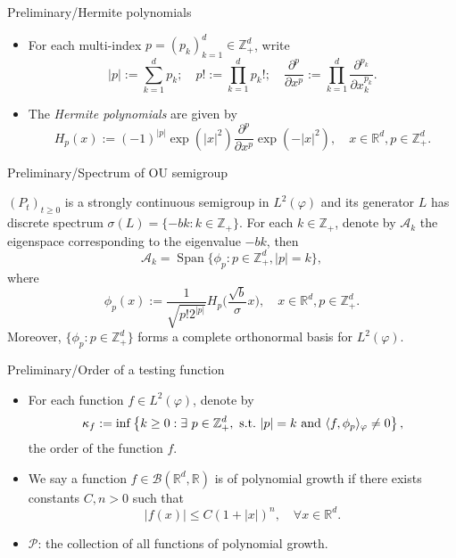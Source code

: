 \documentclass[xcolor=dvipsnames]{beamer}
\begin{document}
\begin{frame}{Preliminary/Hermite polynomials}
\begin{itemize}
\item
    For each multi-index $p = (p_k)_{k = 1}^d \in \mathbb{Z}_+^{d}$, write 
\begin{equation}
	|p|:=\sum_{k=1}^d p_k;
	\quad p!:= \prod_{k= 1}^d p_k!;
	\quad \frac{\partial^p} {\partial x^p}:= \prod_{k = 1}^d\frac{\partial^{p_k}}{\partial x_k^{p_k}}.
\end{equation}
\item
    The \emph{Hermite polynomials} are given by
\begin{equation}
    H_p(x)
    :=(-1)^{|p|}\exp(|x|^2) \frac{\partial ^{p}}{\partial x^p} \exp(-|x|^2) ,
    \quad x\in \mathbb R^d,
    p \in \mathbb{Z}_+^{d}.
\end{equation}
\end{itemize}
\end{frame}

\begin{frame}{Preliminary/Spectrum of OU semigroup}

\begin{lemma}
	$(P_t)_{t\geq 0}$ is a strongly continuous semigroup in $L^2(\varphi)$ and its generator $L$ has discrete spectrum $\sigma(L)= \{-bk: k \in \mathbb Z_+\}$.
    For each $k \in \mathbb Z_+$, denote by $\mathcal{A}_k$ the eigenspace corresponding to the eigenvalue $-bk$, then
\[
    \mathcal{A}_k
    = \operatorname{Span} \{\phi_p : p\in \mathbb Z_+^d, |p|=k\},
\]
    where
\begin{equation}\label{eigenfunction}
    \phi_p(x)
    := \frac{1}{\sqrt{ p! 2^{|p|} }} H_p \Big(\frac{ \sqrt{b} }{\sigma}x \Big),
    \quad x\in \mathbb R^d, p\in \mathbb Z_+^d.
\end{equation}
	Moreover, $\{\phi_p:p\in \mathbb Z_+^d\}$ forms a complete orthonormal basis for $L^2(\varphi)$.
\end{lemma}
\end{frame}

\begin{frame}{Preliminary/Order of a testing function}
\begin{itemize}
\item
    For each function $f\in L^2(\varphi)$, denote by
\begin{equation}
    \kappa_f
    :=\inf \left \{k\geq 0: \exists ~ p\in \mathbb Z_+^d ,{\rm ~s.t.~}|p|=k {\rm ~and~}  \langle f, \phi_p \rangle_{\varphi}\neq 0\right \},
\end{equation}
    the order of the function $f$. 
\item
	We say a function $f\in \mathcal B(\mathbb R^d, \mathbb R)$ is of polynomial growth if there exists constants $C,n>0$ such that 
\[
	|f(x)|\leq C(1+|x|)^n,
	\quad \forall x\in \mathbb R^d.
\]
\item
    $\mathcal P$: the collection of all functions of polynomial growth.
\end{itemize}
\end{frame}
\end{document}
